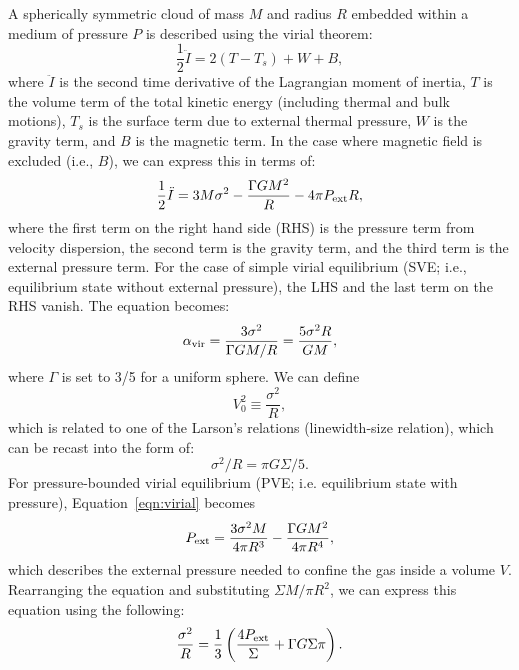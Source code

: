 \documentclass[iop]{emulateapj}
\begin{document}
A spherically symmetric cloud of mass $M$ and radius $R$ embedded within
a medium of pressure $P$ is described using the virial theorem:
\begin{equation}
\frac{1}{2}\ddot I = 2(T - T_s) + W + B,
\end{equation}
where $\ddot I$ is the second time derivative of the Lagrangian moment of inertia,
$T$ is the volume term of the total kinetic energy (including thermal and
bulk motions), $T_s$ is the surface term due to external thermal pressure,
$W$ is the gravity term, and $B$ is the magnetic term.
In the case where magnetic field is excluded (i.e., $B$), we can express this in terms of:
\begin{equation}
\frac{1}{2}\ddot I = 3 M \sigma^2 - \frac{\Gamma GM^2}{R} - 4\pi P_{\rm ext} R,
\label{eqn:virial}
\end{equation}
where the first term on the right hand side (RHS) is the pressure term from velocity dispersion, the second
term is the gravity term, and the third term is the external pressure term.
For the case of simple virial equilibrium (SVE; i.e., equilibrium state without external pressure),
the LHS and the last term on the RHS vanish. The equation becomes:
\begin{equation}
\alpha_{\rm vir} = \frac{3\sigma^2}{\Gamma GM/R} = \frac{5\sigma^2R}{GM},
\label{eqn:alpha}
\end{equation}
where $\Gamma$ is set to 3/5 for a uniform sphere.
We can define
\begin{equation}
V_0^2\equiv\frac{\sigma^2}{R},
\end{equation}
which is related to one of the Larson's relations (linewidth-size relation), 
which can be recast into the form of:
\begin{equation}
\sigma^2/R = \pi G \Sigma/5.
\end{equation}
For pressure-bounded virial equilibrium (PVE; i.e. equilibrium state with pressure), %
Equation~\ref{eqn:virial} becomes
\begin{equation}
P_{\rm ext} = \frac{3\sigma^2M}{4\pi R^3} - \frac{\Gamma G M^2}{4\pi R^4},
\label{eqn:pext}
\end{equation}
which describes the external pressure needed to confine the gas inside a volume $V$.
Rearranging the equation and substituting $\Sigma$\eq$M/\pi R^2$, we can express
this equation using the following:
\begin{equation}
\frac{\sigma^2}{R} = \frac{1}{3}\left(\frac{4P_{\rm ext}}{\Sigma} + \Gamma G \Sigma \pi \right).
\label{eqn:v0}
\end{equation}
\end{document}
